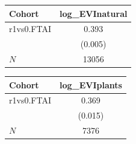 {
\def\sym#1{\ifmmode^{#1}\else\(^{#1}\)\fi}
\begin{tabular}{l*{1}{c}}
\toprule
Cohort    &log\_EVInatural   \\
\midrule
r1vs0.FTAI&    0.393   \\
          &  (0.005)   \\
\midrule
\(N\)     &    13056   \\
\bottomrule
\end{tabular}
}
{
\def\sym#1{\ifmmode^{#1}\else\(^{#1}\)\fi}
\begin{tabular}{l*{1}{c}}
\toprule
Cohort    &log\_EVIplants   \\
\midrule
r1vs0.FTAI&    0.369   \\
          &  (0.015)   \\
\midrule
\(N\)     &     7376   \\
\bottomrule
\end{tabular}
}
